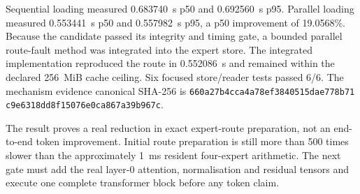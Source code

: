 Sequential loading measured 0.683740~s p50 and 0.692560~s p95.  Parallel
loading measured 0.553441~s p50 and 0.557982~s p95, a p50 improvement of
19.0568\%.  Because the candidate passed its integrity and timing gate, a
bounded parallel route-fault method was integrated into the expert store.
The integrated implementation reproduced the route in 0.552086~s and remained
within the declared 256~MiB cache ceiling.  Six focused store/reader tests
passed 6/6.  The mechanism evidence canonical SHA-256 is
\texttt{660a27b4cca4a78ef3840515dae778b71}%
\allowbreak\texttt{c9e6318dd8f15076e0ca867a39b967c}.

The result proves a real reduction in exact expert-route preparation, not an
end-to-end token improvement.  Initial route preparation is still more than
500 times slower than the approximately 1~ms resident four-expert arithmetic.
The next gate must add the real layer-0 attention, normalisation and residual
tensors and execute one complete transformer block before any token claim.
\endgroup

